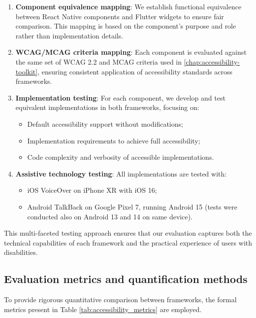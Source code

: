 \begin{enumerate}
    \item \textbf{Component equivalence mapping}: We establish functional equivalence between React Native components and Flutter widgets to ensure fair comparison. This mapping is based on the component's purpose and role rather than implementation details.
    
    \item \textbf{WCAG/MCAG criteria mapping}: Each component is evaluated against the same set of WCAG 2.2 and MCAG criteria used in \ref{chap:accessibility-toolkit}, ensuring consistent application of accessibility standards across frameworks.
    
    \item \textbf{Implementation testing}: For each component, we develop and test equivalent implementations in both frameworks, focusing on:
    \begin{itemize}
        \item Default accessibility support without modifications;
        \item Implementation requirements to achieve full accessibility;
        \item Code complexity and verbosity of accessible implementations.
    \end{itemize}
    
    \item \textbf{Assistive technology testing}: All implementations are tested with:
    \begin{itemize}
        \item iOS VoiceOver on iPhone XR with iOS 16;
        \item Android TalkBack on Google Pixel 7, running Android 15 (tests were conducted also on Android 13 and 14 on same device).
    \end{itemize}
\end{enumerate}

This multi-faceted testing approach ensures that our evaluation captures both the technical capabilities of each framework and the practical experience of users with disabilities.

\subsection{Evaluation metrics and quantification methods}

To provide rigorous quantitative comparison between frameworks, the formal metrics present in Table \ref{tab:accessibility_metrics} are employed.

